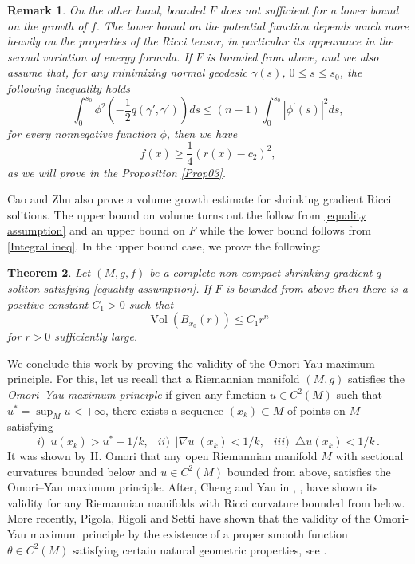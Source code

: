 \documentclass{amsart}
\theoremstyle{plain}
\newtheorem{theorem}{\bf Theorem}[section]
\newtheorem{remark}[theorem]{Remark}
\numberwithin{equation}{section}
\begin{document}
\begin{remark}\label{Rmk01}
{\em 
On the other hand, bounded $F$ does not sufficient for a lower bound on the growth of $f$.  The lower bound on the potential function depends much more heavily on the properties of the Ricci tensor, in particular its appearance in the second variation of energy formula.  If
$F$ is bounded from above, and we also assume that, for any minimizing normal geodesic $\gamma(s)$, $0\leq s\leq s_0$, the following inequality holds 
\begin{equation}\label{Integral ineq}
\int_{0}^{s_0}\phi^2\left(-\frac{1}{2}q(\gamma',\gamma')\right)ds\leq (n-1)\int_{0}^{s_0}|\phi^{\prime}(s)|^2 ds,
    \end{equation}
 for every nonnegative function $\phi$, then we have 
 \begin{equation}\label{bound from below}
    f(x)\geq \frac{1}{4}\left(r(x)-c_2 \right)^{2},
 \end{equation}
 as we will prove in the Proposition \ref{Prop03}.}
\end{remark}

Cao and Zhu also prove a volume growth estimate for shrinking gradient Ricci solitions. The upper bound on volume turns out the follow from \eqref{equality assumption} and an upper bound on $F$ while the lower bound follows from \eqref{Integral ineq}. In the upper bound case, we prove the following:

\begin{theorem}\label{thm06}
Let $\left(M,g,f\right)$ be a complete non-compact shrinking gradient $q$-soliton satisfying \eqref{equality assumption}. If $F$ is bounded from above then there is a positive constant $C_1>0$ such that \begin{equation}
\operatorname{Vol}\left(B_{x_0}(r)\right) \leq C_1 r^n
\end{equation}
for $r>0$ sufficiently large.
\end{theorem}


 We conclude this work by proving the validity of the Omori-Yau maximum principle. For this, let us recall that a Riemannian manifold $(M,g)$ satisfies the {\em Omori–Yau maximum principle} if given any
function $u\in C^2(M)$ such that $u^\ast=\sup_M u<+\infty$, there exists a sequence $(x_k)\subset M$ of points on $M$ satisfying
\begin{equation}\label{eqOY}i)\,\,\, u(x_k)> u^{\ast}-1/k, \,\,\,\;ii)\,\, \,\vert \nabla u \vert (x_k)<1/k,\,\,\,\;iii)\,\,\, \triangle u (x_k) < 1/k\,. \end{equation}
It was shown by H. Omori  \cite{omori} that any open Riemannian manifold  $M$ with sectional curvatures bounded below  and $u\in C^{2}(M)$ bounded from above, satisfies the Omori–Yau maximum principle. After, Cheng and Yau in \cite{cheng-yau-math-ann-77}, \cite{yau}, have shown its validity for any  Riemannian manifolds with Ricci curvature bounded from below. More recently, Pigola, Rigoli and Setti have shown that the validity of the Omori-Yau maximum principle by
 the existence of a proper  smooth function $\theta \in C^{2}(M)$ satisfying certain natural geometric properties, see \cite[Theorem 1.9]{PRS-Memoirs}. 
 
\end{document}

